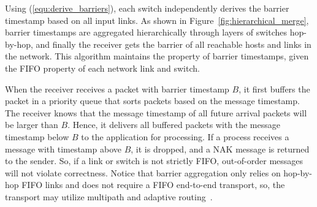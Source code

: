 Using (\ref{equ:derive_barriers}), each switch independently derives the barrier timestamp based on all input links.
As shown in Figure~\ref{fig:hierarchical_merge}, barrier timestamps are aggregated hierarchically through layers of switches hop-by-hop, and finally the receiver gets the barrier of all reachable hosts and links in the network.
This algorithm maintains the property of barrier timestamps, given the FIFO property of each network link and switch.



When the receiver receives a packet with barrier timestamp $B$, it first buffers the packet in a priority queue that sorts packets based on the message timestamp. The receiver knows that the message timestamp of all future arrival packets will be larger than $B$. Hence, it delivers all buffered packets with the message timestamp below $B$ to the application for processing.
If a process receives a message with timestamp above $B$, it is dropped, and a NAK message is returned to the sender. So, if a link or switch is not strictly FIFO, out-of-order messages will not violate correctness.
Notice that barrier aggregation only relies on hop-by-hop FIFO links and does not require a FIFO end-to-end transport, so, the transport may utilize multipath and adaptive routing~\cite{glass1992turn}.





